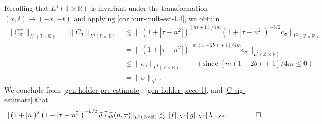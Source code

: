 \documentclass[12pt,reqno]{amsart}
\numberwithin{equation}{section}  %
\numberwithin{figure}{section}
\newcommand{\rr}{\mathbb{R}}
\newcommand{\zz}{\mathbb{Z}}
\newcommand{\ci}{\mathbb{T}}
\newcommand{\wh}{\widehat}
\theoremstyle{plain}
\theoremstyle{definition}
\theoremstyle{remark}
\begin{document}
%
%
Recalling that $L^4(\ci \times \rr)$ is invariant under the transformation $(x, 
t) \mapsto (-x,-t)$ and applying 
\autoref{cor:four-mult-est-L4}, we obtain
%
%
\begin{equation}
  \label{C-sig-estimate}
  \begin{split}
    \| C^+_\sigma \|_{L^4(\ci \times \rr)} = \|C_\sigma \|_{L^4(\ci \times \rr)} 
    & \lesssim \|\left( 1 + | \tau - n^{2} | 
    \right)^{(m +1)/4m} \left( 1 + | \tau - n^{2} | 
    \right)^{-b/2} c_\sigma \|_{L^2(\zz \times \rr)}
    \\
    & = \|\left( 1 + | \tau - n^{2} | 
    \right)^{[m(1 - 2b) + 1]/4m } c_\sigma \|_{L^2(\zz \times \rr)}
    \\
    & \le \|c_\sigma \|_{L^2(\zz \times \rr)}  \qquad (\text{since  } [m(1 - 2b) + 
    1]/4m \le 0 )
    \\
    & = \|\sigma\|_{X^s}.
  \end{split}
\end{equation}
%
%
We conclude from \eqref{gen-holder-pre-estimate}, \eqref{gen-holder-piece-1}, 
and \eqref{C-sig-estimate} that
%
%
%
%
\begin{equation*}
  \begin{split}
    \| \left( 1 + |n | \right)^s \left( 1 + | \tau - n^{2} | \right)^{-b/2} \wh{{w}_{fgh}} 
    (n, \tau) \|_{L^2(\zz \times \rr)} \lesssim 
    \|f\|_{X^s}\|g\|_{X^s}\|h\|_{X^s}. \qquad \qed
  \end{split}
\end{equation*}
%
%
%
%
%
%
%
\end{document}
